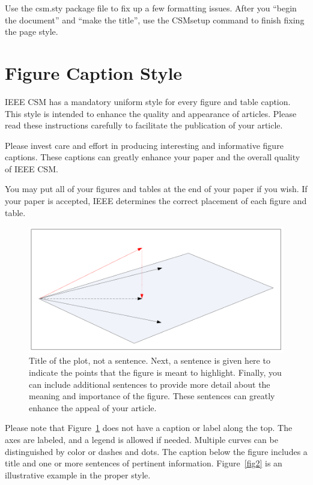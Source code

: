 \documentclass[letterpaper,12pt,peerreviewca,draftcls]{IEEEtran}
\begin{document}
Use the csm.sty \cite{csm.sty} package file to fix up a few formatting
issues.  After you ``begin the document'' and ``make the title'', use
the CSMsetup command to finish fixing the page style.







\section{Figure Caption Style}


IEEE CSM has a mandatory uniform style for every figure and table
caption.  This style is intended to enhance the quality and
appearance of articles. Please read these instructions carefully
to facilitate the publication of your article.

Please invest care and effort in producing interesting and
informative figure captions.  These captions can greatly enhance
your paper and the overall quality of IEEE CSM.



You may put all of your figures and tables at the end of your
paper if you wish.  If your paper is accepted, IEEE determines the
correct placement of each figure and table.


\begin{figure}[t]
\centering
\includegraphics[scale=0.5]{sensitivity}
\caption{Title of the plot, not a sentence.  Next, a sentence is
given
  here to indicate the points that the figure is meant to
  highlight. Finally, you can include additional sentences to provide
  more detail about the meaning and importance of the figure.  These
  sentences can greatly enhance the appeal of your article.}
\label{fig1}
\end{figure}




Please note that Figure~\ref{fig1} does not have a caption or
label along the top.  The axes are labeled, and a legend is
allowed if needed. Multiple curves can be distinguished by color
or dashes and dots. The caption below the figure includes a title
and one or more sentences of pertinent information.
Figure~\ref{fig2} is an illustrative example in the proper style.
\end{document}
